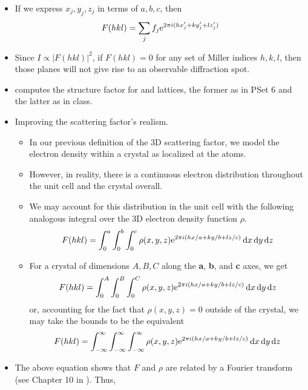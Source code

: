 \documentclass[../notes.tex]{subfiles}
\begin{document}
\begin{itemize}
    \item If we express $x_j,y_j,z_j$ in terms of $a,b,c$, then
    \begin{equation*}
        F(hkl) = \sum_jf_j\e[2\pi i(hx_j'+ky_j'+lz_j')]
    \end{equation*}
    \item Since $I\propto|F(hkl)|^2$, if $F(hkl)=0$ for any set of Miller indices $h,k,l$, then those planes will not give rise to an observable diffraction spot.
    \item \textcite{bib:McQuarrieSimon} computes the structure factor for  and  lattices, the former as in PSet 6 and the latter as in class.
    \item Improving the scattering factor's realism.
    \begin{itemize}
        \item In our previous definition of the 3D scattering factor, we model the electron density within a crystal as localized at the atoms.
        \item However, in reality, there is a continuous electron distribution throughout the unit cell and the crystal overall.
        \item We may account for this distribution in the unit cell with the following analogous integral over the 3D electron density function $\rho$.
        \begin{equation*}
            F(hkl) = \int_0^a\int_0^b\int_0^c\rho(x,y,z)\e[2\pi i(hx/a+ky/b+lz/c)]\dd{x}\dd{y}\dd{z}
        \end{equation*}
        \item For a crystal of dimensions $A,B,C$ along the \textbf{a}, \textbf{b}, and \textbf{c} axes, we get
        \begin{equation*}
            F(hkl) = \int_0^A\int_0^B\int_0^C\rho(x,y,z)\e[2\pi i(hx/a+ky/b+lz/c)]\dd{x}\dd{y}\dd{z}
        \end{equation*}
        or, accounting for the fact that $\rho(x,y,z)=0$ outside of the crystal, we may take the bounds to be the equivalent
        \begin{equation*}
            F(hkl) = \int_{-\infty}^\infty\int_{-\infty}^\infty\int_{-\infty}^\infty\rho(x,y,z)\e[2\pi i(hx/a+ky/b+lz/c)]\dd{x}\dd{y}\dd{z}
        \end{equation*}
    \end{itemize}
    \item The above equation shows that $F$ and $\rho$ are related by a Fourier transform (see Chapter 10 in \textcite{bib:LinAlgNotes}). Thus,

\end{itemize}
\end{document}
